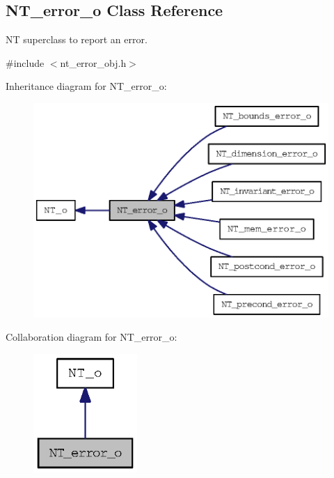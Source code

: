 \subsection{NT\_\-error\_\-o Class Reference}
\label{class_n_t__error__o}


NT superclass to report an error.  




{\ttfamily \#include $<$nt\_\-error\_\-obj.h$>$}



Inheritance diagram for NT\_\-error\_\-o:
\nopagebreak
\begin{figure}[H]
\begin{center}
\leavevmode
\includegraphics[width=352pt]{class_n_t__error__o__inherit__graph}
\end{center}
\end{figure}


Collaboration diagram for NT\_\-error\_\-o:
\nopagebreak
\begin{figure}[H]
\begin{center}
\leavevmode
\includegraphics[width=112pt]{class_n_t__error__o__coll__graph}
\end{center}
\end{figure}
